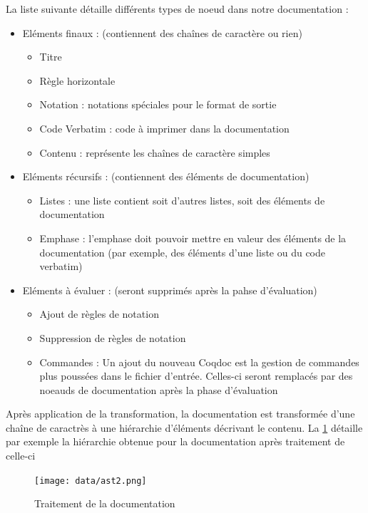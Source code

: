 \documentclass[a4paper, 11pt]{report}
\begin{document}
    La liste suivante détaille différents types de noeud dans notre
    documentation :
    \begin{itemize}
      \item Eléments finaux : (contiennent des chaînes de caractère ou rien) \\
        \begin{itemize}
            \item Titre
            \item Règle horizontale
            \item Notation : notations spéciales pour le format de sortie
            \item Code Verbatim : code à imprimer dans la documentation
            \item Contenu : représente les chaînes de caractère simples
        \end{itemize}
      \item Eléments récursifs : (contiennent des éléments de documentation) \\
        \begin{itemize}
          \item Listes : une liste contient soit d'autres listes, soit des
                éléments de documentation
          \item Emphase : l'emphase doit pouvoir mettre en valeur des éléments
                de la documentation (par exemple, des éléments d'une liste ou
                du code verbatim)
        \end{itemize}
      \item Eléments à évaluer : (seront supprimés après la pahse d'évaluation) \\
        \begin{itemize}
          \item Ajout de règles de notation
          \item Suppression de règles de notation
          \item Commandes : Un ajout du nouveau Coqdoc est la gestion de
                commandes plus poussées dans le fichier d'entrée. Celles-ci
                seront remplacés par des noeauds de documentation après la
                phase d'évaluation
        \end{itemize}
    \end{itemize}
    Après application de la transformation, la documentation est transformée
    d'une chaîne de caractrès à une hiérarchie d'éléments décrivant le contenu.
    La \cref{ast2} détaille par exemple la hiérarchie obtenue pour la
   documentation après traitement de celle-ci
    \begin{figure}
      \texttt{[image: data/ast2.png]}
      \caption{Traitement de la documentation}
      \label{ast2}
    \end{figure}
\end{document}
